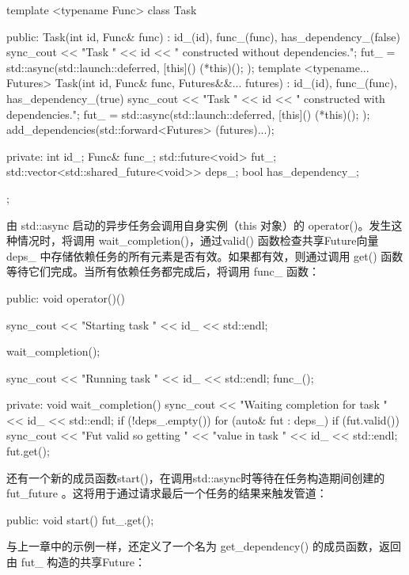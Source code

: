 \begin{cpp}
template <typename Func>
class Task {
    public:
    Task(int id, Func& func)
        : id_(id), func_(func), has_dependency_(false) {
        sync_cout << "Task " << id
                  << " constructed without dependencies.\n";
        fut_ = std::async(std::launch::deferred,
        [this](){ (*this)(); });
    }
    template <typename... Futures>
    Task(int id, Func& func, Futures&&... futures)
        : id_(id), func_(func), has_dependency_(true) {
        sync_cout << "Task " << id
                  << " constructed with dependencies.\n";
        fut_ = std::async(std::launch::deferred,
                          [this](){ (*this)(); });
        add_dependencies(std::forward<Futures>
                                     (futures)...);
    }

private:
    int id_;
    Func& func_;
    std::future<void> fut_;
    std::vector<std::shared_future<void>> deps_;
    bool has_dependency_;
};
\end{cpp}

由 std::async 启动的异步任务会调用自身实例（this 对象）的 operator()。发生这种情况时，将调用 wait\_completion()，通过valid() 函数检查共享Future向量 deps\_ 中存储依赖任务的所有元素是否有效。如果都有效，则通过调用 get() 函数等待它们完成。当所有依赖任务都完成后，将调用 func\_ 函数：

\begin{cpp}
public:
void operator()() {
    sync_cout << "Starting task " << id_ << std::endl;

    wait_completion();

    sync_cout << "Running task " << id_ << std::endl;
    func_();
}
private:
void wait_completion() {
    sync_cout << "Waiting completion for task "
              << id_ << std::endl;
    if (!deps_.empty()) {
        for (auto& fut : deps_) {
            if (fut.valid()) {
                sync_cout << "Fut valid so getting "
                          << "value in task " << id_
                          << std::endl;
                fut.get();
            }
        }
    }
}
\end{cpp}

还有一个新的成员函数start()，在调用std::async时等待在任务构造期间创建的fut\_future 。这将用于通过请求最后一个任务的结果来触发管道：

\begin{cpp}
public:
void start() {
    fut_.get();
}
\end{cpp}

与上一章中的示例一样，还定义了一个名为 get\_dependency() 的成员函数，返回由 fut\_ 构造的共享Future：

